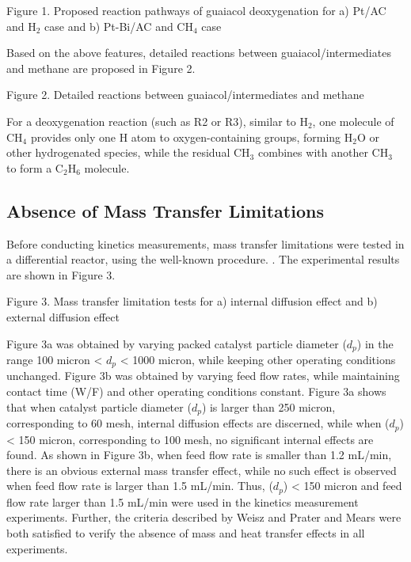 \documentclass[journal=iecred,manuscript=article]{achemso}
\begin{document}
\begin{center}
\epsfxsize=350pt

Figure 1. Proposed reaction pathways of guaiacol deoxygenation for a) Pt/AC and H$_{2}$ case and b) Pt-Bi/AC and CH$_{4}$ case

\end{center}

Based on the above features, detailed reactions between guaiacol/intermediates and methane are proposed in Figure 2.

\begin{center}
\epsfxsize=350pt

Figure 2. Detailed reactions between guaiacol/intermediates and methane

\end{center}

For a deoxygenation reaction (such as R2 or R3), similar to H$_{2}$,
one molecule of CH$_{4}$ provides only one H atom to oxygen-containing groups,
forming H$_{2}$O or other hydrogenated species,
while the residual CH$_{3}$ combines with another CH$_{3}$ to form a C$_{2}$H$_{6}$ molecule. 

\subsection{Absence of Mass Transfer Limitations}
Before conducting kinetics measurements,
mass transfer limitations were tested in a differential reactor,
using the well-known procedure. \cite{Perego1999}. The experimental results are shown in Figure 3.

\begin{center}
\epsfxsize=500pt

Figure 3. Mass transfer limitation tests for a) internal diffusion effect and b) external diffusion effect
\end{center}

Figure 3a was obtained by varying packed catalyst particle diameter ($d_{p}$)
in the range 100 micron < $d_{p}$ < 1000 micron,
while keeping other operating conditions unchanged.
Figure 3b was obtained by varying feed flow rates,
while maintaining contact time (W/F) and other operating conditions constant.
Figure 3a shows that when catalyst particle diameter ($d_{p}$) is larger than 250 micron,
corresponding to 60 mesh, internal diffusion effects are discerned,
while when ($d_{p}$) < 150 micron, corresponding to 100 mesh, no significant internal effects are found.
As shown in Figure 3b, when feed flow rate is smaller than 1.2 mL/min, 
there is an obvious external mass transfer effect,
while no such effect is observed
when feed flow rate is larger than 1.5 mL/min.
Thus, ($d_{p}$) < 150 micron and feed flow rate larger than 1.5 mL/min were used in the kinetics measurement experiments.
Further, the criteria described by Weisz and Prater \cite{Weisz1954} and
Mears \cite{Mears1971} were both satisfied to verify the absence of mass and heat transfer effects in all experiments.
\end{document}
